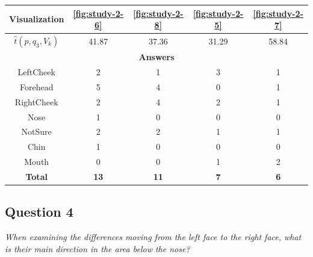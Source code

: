 \begin{center}
\begin{tabular}{| c | c | c | c | c |}
	\hline
	Visualization & \ref{fig:study-2-6} & \ref{fig:study-2-8} & \ref{fig:study-2-5} & \ref{fig:study-2-7}\\ \hline
	\(\widehat{t}(p, q_3, V_k)\) & 41.87 & 37.36 & 31.29 & 58.84\\ \hline
	\multicolumn{5}{|c|}{\bf Answers} \\ \hline
	LeftCheek & 2 & 1 & 3 & 1\\ \hline
	Forehead & 5 & 4 & 0 & 1\\ \hline
	\rowcolor{yellow!30} RightCheek & 2 & 4 & 2 & 1\\ \hline
	Nose & 1 & 0 & 0 & 0\\ \hline
	NotSure & 2 & 2 & 1 & 1\\ \hline
	Chin & 1 & 0 & 0 & 0\\ \hline
	Mouth & 0 & 0 & 1 & 2\\ \hline
	{\bf Total} & {\bf 13} & {\bf 11} & {\bf 7} & {\bf 6}\\ \hline
\end{tabular}
\end{center}
\clearpage

\subsection{Question 4}
\label{attch:complete_study_results-question4}

\begin{center}{\it When examining the differences moving from the left face to the right face, what is their main direction in the area below the nose?}\end{center}


